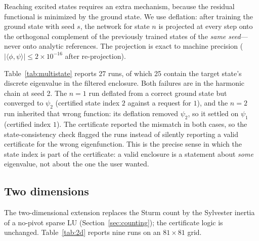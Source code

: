Reaching excited states requires an extra mechanism, because the residual
functional is minimized by the ground state. We use deflation: after training
the ground state with seed $s$, the network for state $n$ is projected at
every step onto the orthogonal complement of the previously trained states of
the \emph{same seed}---never onto analytic references. The projection is exact
to machine precision ($|\langle\phi,\psi\rangle|\le2\times10^{-16}$ after
re-projection).

\begin{table}[t]
\centering
\small

\caption{Multiple states with seed-consistent deflation. ``match'' counts runs
whose certified state index equals the target; ``contains $n$'' counts runs
that both match and whose enclosure contains the target state's discrete
eigenvalue. Every valid enclosure in the chain contains \emph{its own}
reference eigenvalue; the two runs lost to the column are those certified to
the neighbouring state.}
\label{tab:multistate}
\end{table}

Table~\ref{tab:multistate} reports 27 runs, of which 25 contain the target
state's discrete eigenvalue in the filtered enclosure. Both failures are in
the harmonic chain at seed 2. The $n=1$ run deflated from a correct ground
state but converged to $\psi_2$ (certified state index $2$ against a request
for $1$), and the $n=2$ run inherited that wrong function: its deflation
removed $\psi_2$, so it settled on $\psi_1$ (certified index $1$). The
certificate reported the mismatch in both cases, so the state-consistency
check flagged the runs instead of silently reporting a valid certificate for
the wrong eigenfunction. This is the precise sense in which the state index is
part of the certificate: a valid enclosure is a statement about \emph{some}
eigenvalue, not about the one the user wanted.

\subsection{Two dimensions}
\label{sec:2d}

The two-dimensional extension replaces the Sturm count by the Sylvester
inertia of a no-pivot sparse LU (Section~\ref{sec:counting}); the certificate
logic is unchanged. Table~\ref{tab:2d} reports nine runs on an $81\times81$
grid.

\begin{table}[t]
\centering
\small

\caption{Two-dimensional ground states, $81\times81$ grid, three seeds per
potential. $\lambda_h$ is computed by a dense LAPACK solve of the same matrix,
independently of the network and of the ARPACK values that propose the
intervals.}
\label{tab:2d}
\end{table}

